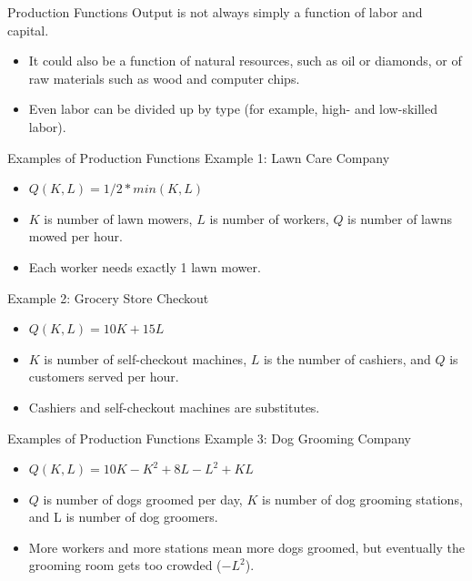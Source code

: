 \documentclass{beamer}
\begin{document}
\begin{frame}{Production Functions}
  Output is not always simply a function of labor and capital.
  
  \bigskip
  \begin{itemize}
    \item It could also be a function of natural resources, such as oil or diamonds, or of raw materials such as wood and computer chips.

    \item Even labor can be divided up by type (for example, high- and low-skilled labor).
  \end{itemize}
\end{frame}

\begin{frame}{Examples of Production Functions}
  Example 1: Lawn Care Company

  \begin{itemize}
    \item $Q(K,L) = 1/2 * min(K,L)$
    \item $K$ is number of lawn mowers, $L$ is number of workers, $Q$ is number of lawns mowed per hour.
    \item Each worker needs exactly 1 lawn mower.
  \end{itemize}

  \bigskip
  Example 2: Grocery Store Checkout

  \begin{itemize}
    \item $Q(K,L) = 10K + 15L$
    \item $K$ is number of self-checkout machines, $L$ is the number of cashiers, and $Q$ is customers served per hour.
    \item Cashiers and self-checkout machines are substitutes.
  \end{itemize}
\end{frame}

\begin{frame}{Examples of Production Functions}
  Example 3: Dog Grooming Company

  \begin{itemize}
    \item $Q(K,L) = 10K - K^2 + 8L - L^2 + KL$
    \item $Q$ is number of dogs groomed per day, $K$ is number of dog grooming stations, and L is number of dog groomers.
    \item More workers and more stations mean more dogs groomed, but eventually the grooming room gets too crowded ($-L^2$).
  \end{itemize}
\end{frame}
\end{document}
